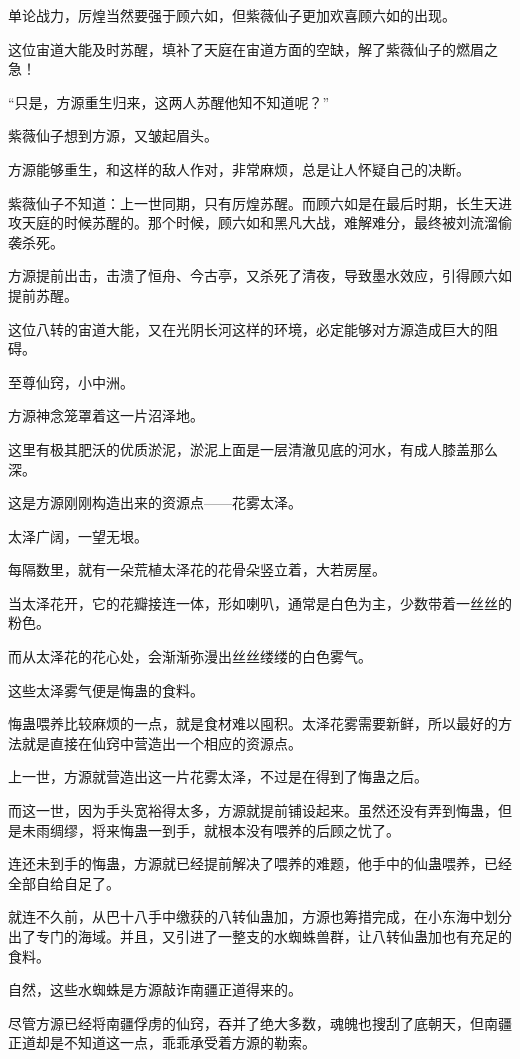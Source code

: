 \begin{this_body}
单论战力，厉煌当然要强于顾六如，但紫薇仙子更加欢喜顾六如的出现。

这位宙道大能及时苏醒，填补了天庭在宙道方面的空缺，解了紫薇仙子的燃眉之急！

“只是，方源重生归来，这两人苏醒他知不知道呢？”

紫薇仙子想到方源，又皱起眉头。

方源能够重生，和这样的敌人作对，非常麻烦，总是让人怀疑自己的决断。

紫薇仙子不知道：上一世同期，只有厉煌苏醒。而顾六如是在最后时期，长生天进攻天庭的时候苏醒的。那个时候，顾六如和黑凡大战，难解难分，最终被刘流溜偷袭杀死。

方源提前出击，击溃了恒舟、今古亭，又杀死了清夜，导致墨水效应，引得顾六如提前苏醒。

这位八转的宙道大能，又在光阴长河这样的环境，必定能够对方源造成巨大的阻碍。

至尊仙窍，小中洲。

方源神念笼罩着这一片沼泽地。

这里有极其肥沃的优质淤泥，淤泥上面是一层清澈见底的河水，有成人膝盖那么深。

这是方源刚刚构造出来的资源点——花雾太泽。

太泽广阔，一望无垠。

每隔数里，就有一朵荒植太泽花的花骨朵竖立着，大若房屋。

当太泽花开，它的花瓣接连一体，形如喇叭，通常是白色为主，少数带着一丝丝的粉色。

而从太泽花的花心处，会渐渐弥漫出丝丝缕缕的白色雾气。

这些太泽雾气便是悔蛊的食料。

悔蛊喂养比较麻烦的一点，就是食材难以囤积。太泽花雾需要新鲜，所以最好的方法就是直接在仙窍中营造出一个相应的资源点。

上一世，方源就营造出这一片花雾太泽，不过是在得到了悔蛊之后。

而这一世，因为手头宽裕得太多，方源就提前铺设起来。虽然还没有弄到悔蛊，但是未雨绸缪，将来悔蛊一到手，就根本没有喂养的后顾之忧了。

连还未到手的悔蛊，方源就已经提前解决了喂养的难题，他手中的仙蛊喂养，已经全部自给自足了。

就连不久前，从巴十八手中缴获的八转仙蛊加，方源也筹措完成，在小东海中划分出了专门的海域。并且，又引进了一整支的水蜘蛛兽群，让八转仙蛊加也有充足的食料。

自然，这些水蜘蛛是方源敲诈南疆正道得来的。

尽管方源已经将南疆俘虏的仙窍，吞并了绝大多数，魂魄也搜刮了底朝天，但南疆正道却是不知道这一点，乖乖承受着方源的勒索。


\end{this_body}
